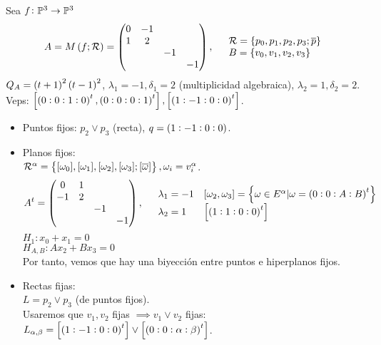 \begin{example}
    Sea $f \colon \mathbb{P}^3 \to \mathbb{P}^3$ \\
    \[
        A = M\left( f; \mathcal{R}\right) = \begin{pmatrix}
        0 & -1 & & \\
        1 & 2 & & \\
        & & -1 & \\
        & & & -1
        \end{pmatrix}, \quad \begin{array}{l}
        \mathcal{R} = \{p_0, p_1, p_2, p_3; \overline{p}\} \\
        B = \{v_0, v_1, v_2, v_3\}
        \end{array}
    \]
    $Q_A = \left( t+1\right)^2\left( t-1\right)^2$, $\lambda_1 = -1, \delta_1 = 2 $ (multiplicidad algebraica), $\lambda_2 = 1, \delta_2 = 2$. Veps: $\left[ \left(0:0:1:0\right)^t, \left(0:0:0:1\right)^t \right], \left[ \left(1:-1:0:0\right)^t \right]$.
    \begin{itemize}
        \item Puntos fijos: $p_2 \vee p_3$ (recta), $q =\left( 1:-1:0:0\right)$.
        \item Planos fijos: \\
        $\mathcal{R}^\alpha = \left\{ [\omega_0], [\omega_1], [\omega_2], [\omega_3]; [\overline{\omega}]\right\}, \omega_i = v_i^\alpha$.
        \[
            A^t = \begin{pmatrix}
                0 & 1 & & \\
                -1 & 2 & & \\
                & & -1 & \\
                & & & -1
            \end{pmatrix}, \quad
            \begin{array}{ll}
                \lambda_1 = -1 & \left[ \omega_2, \omega_3 \right] = \left\{ \omega \in E^\alpha | \omega = \left( 0:0:A:B\right)^t \right\} \\
                \lambda_2 = 1 & \left[\left(1:1:0:0\right)^t\right]
            \end{array}
        \]
        $H_1 \colon x_0 + x_1 = 0$ \\
        $H_{A,B} \colon Ax_2 + Bx_3 = 0$\\
        Por tanto, vemos que hay una biyección entre puntos e hiperplanos fijos.
        \item Rectas fijas: \\
        $L = p_2 \vee p_3$ (de puntos fijos).\\
        Usaremos que $v_1,v_2$ fijas $\implies v_1 \vee v_2$ fijas: $L_{\alpha,\beta} = \left[\left(1:-1:0:0\right)^t\right]\vee\left[\left(0:0:\alpha:\beta\right)^t\right]$.

\end{itemize}
\end{example}
